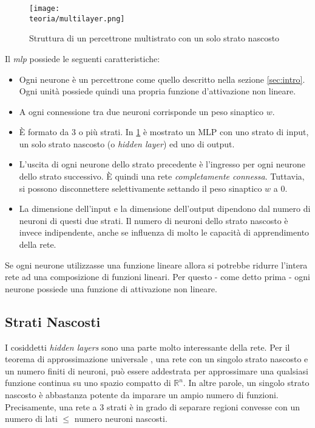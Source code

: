 \begin{figure}[h!]
 \centering
 \texttt{[image: \\teoria/multilayer.png]}
 \caption{Struttura di un percettrone multistrato con un solo strato nascosto}
 \label{fig:multilayer}
\end{figure}


Il \emph{mlp} possiede le seguenti caratteristiche: 
\begin{itemize}
\item Ogni neurone è un percettrone come quello descritto nella sezione \ref{sec:intro}. Ogni unità possiede quindi una propria funzione d'attivazione non lineare.
\item A ogni connessione tra due neuroni corrisponde un peso sinaptico $w$.
\item È formato da 3 o più strati. In \ref{fig:multilayer} è mostrato un MLP con uno strato di input, un solo strato nascosto (o \emph{hidden layer}) ed uno di output.
\item L'uscita di ogni neurone dello strato precedente è l'ingresso per ogni neurone dello
strato successivo. È quindi una rete \emph{completamente connessa}. Tuttavia, si possono
disconnettere selettivamente settando il peso sinaptico $w$ a 0.
\item La dimensione dell'input e la dimensione dell'output dipendono dal numero di
neuroni di questi due strati. Il numero di neuroni dello strato nascosto è invece
indipendente, anche se influenza di molto le capacità di apprendimento della rete. 
\end{itemize}
Se ogni neurone utilizzasse una funzione lineare allora si potrebbe ridurre l'intera rete ad una composizione di funzioni lineari. Per questo - come detto prima - ogni neurone possiede una funzione di attivazione non lineare. 

\subsection{Strati Nascosti}
I cosiddetti \emph{hidden layers} sono una parte molto interessante della rete. Per il teorema di
approssimazione universale \parencite{WApprox}, una rete con un singolo strato nascosto e un numero finiti di
neuroni, può essere addestrata per approssimare una qualsiasi funzione continua su uno spazio compatto di $\mathbb{R}^n$. In altre parole, un singolo strato nascosto è abbastanza potente da imparare un ampio numero di funzioni. Precisamente, una rete a 3 strati è in grado di separare regioni convesse con un numero di lati $\leqslant$ numero neuroni nascosti. 

